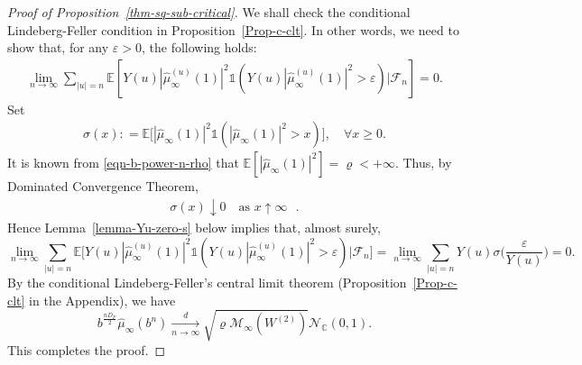 \documentclass[12pt]{amsart}
\theoremstyle{definition}
\theoremstyle{remark}
\newcommand{\C}{\mathbb{C}}
\newcommand{\E}{\mathbb{E}}
\newcommand{\VU}{Y(u)}
\numberwithin{equation}{section}
\begin{document}
\begin{proof}[Proof of Proposition~\ref{thm-sq-sub-critical}]
We shall check the conditional  Lindeberg-Feller condition in Proposition~\ref{Prop-c-clt}. 
In other words, we need to show that,  for any $\varepsilon>0$, the following holds:
 \begin{align}\label{eqn-CLT-feller}
\lim_{n\rightarrow \infty} \sum_{|u|=n} \E[\VU |\widehat{\mu}_{\infty}^{(u)}(1)|^2\mathds{1}(\VU |\widehat{\mu}_{\infty}^{(u)}(1)|^2>\varepsilon)|\mathscr{F}_n]=0.
 \end{align}
Set 
 \begin{align}\label{eqn-CLT-sigma}
\sigma(x): =\E\big[|\widehat{\mu}_{\infty}(1)|^2 \mathds{1}(|\widehat{\mu}_{\infty}(1)|^2>x)\big], \quad \forall x \geqslant 0.
\end{align}
It is known from \eqref{eqn-b-power-n-rho}  that $\E[|\widehat{\mu}_{\infty}(1)|^2]=\varrho<+\infty$. Thus, by  Dominated Convergence Theorem,  
\begin{align}\label{sigma-to-zero}
\sigma(x)\downarrow 0 \quad \text{as $x\uparrow \infty $ }.
\end{align}
Hence  Lemma~\ref{lemma-Yu-zero-s} below  implies that, almost surely, 
\[
\lim_{n\rightarrow \infty} \sum_{|u|=n} \E\Big[\VU |\widehat{\mu}_{\infty}^{(u)}(1)|^2\mathds{1}(\VU |\widehat{\mu}_{\infty}^{(u)}(1)|^2>\varepsilon)\Big| \mathscr{F}_n\Big]=\lim_{n\rightarrow \infty} \sum_{|u|=n} \VU\sigma\Big(\frac{\varepsilon}{\VU}\Big)=0.
\]
By the conditional  Lindeberg-Feller's central limit theorem (Proposition~\ref{Prop-c-clt} in the Appendix),  we have
\[
b^{\frac{n D_F}{2}} \widehat{\mu}_{\infty}(b^n)\xrightarrow[n\to\infty]{d} \sqrt{\varrho\mathscr{M}_\infty(W^{(2)})}\mathcal{N}_\C(0,1). 
\]
This completes the proof.
\end{proof}
\end{document}
